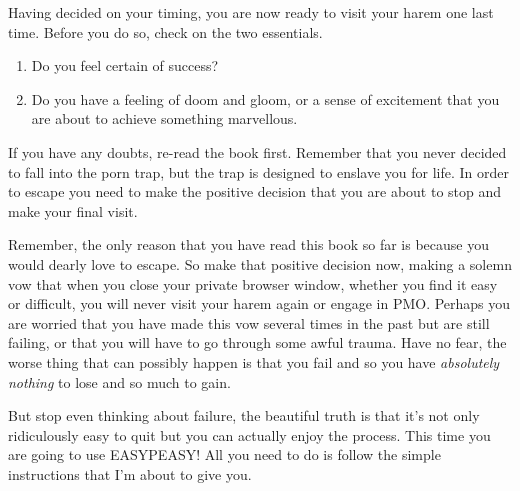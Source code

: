 \documentclass[easypeasy.tex]{subfiles}
\begin{document}
Having decided on your timing, you are now ready to visit your harem one last time. Before you do so, check on the two essentials.
\begin{enumerate}
  \item Do you feel certain of success?
  \item Do you have a feeling of doom and gloom, or a sense of excitement that you are about to achieve something marvellous.
\end{enumerate}

If you have any doubts, re-read the book first. Remember that you never decided to fall into the porn trap, but the trap is designed to enslave you for life. In order to escape you need to make the positive decision that you are about to stop and make your final visit.

Remember, the only reason that you have read this book so far is because you would dearly love to escape. So make that positive decision now, making a solemn vow that when you close your private browser window, whether you find it easy or difficult, you will never visit your harem again or engage in PMO. Perhaps you are worried that you have made this vow several times in the past but are still failing, or that you will have to go through some awful trauma. Have no fear, the worse thing that can possibly happen is that you fail and so you have \textit{absolutely nothing} to lose and so much to gain.

But stop even thinking about failure, the beautiful truth is that it's not only ridiculously easy to quit but you can actually enjoy the process. This time you are going to use EASYPEASY! All you need to do is follow the simple instructions that I'm about to give you.
\end{document}

